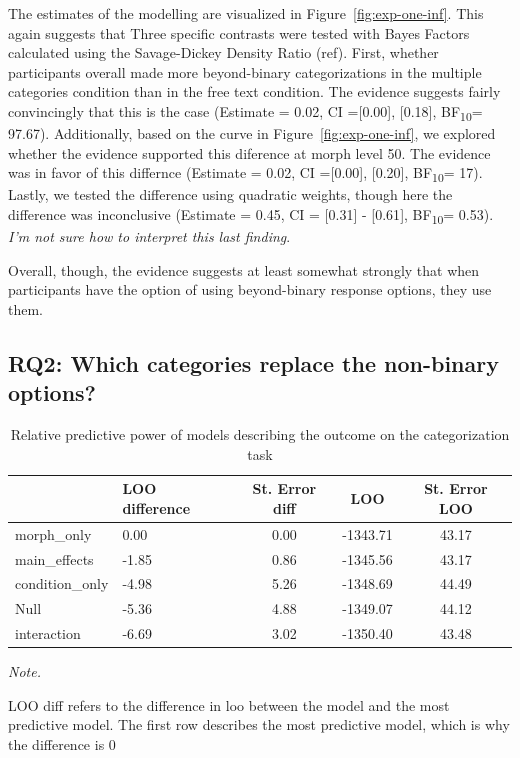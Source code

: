 \documentclass[
  man]{apa7}
\begin{document}
The estimates of the modelling are visualized in Figure~\ref{fig:exp-one-inf}. This again suggests that Three specific contrasts were tested with Bayes Factors calculated using the Savage-Dickey Density Ratio (ref). First, whether participants overall made more beyond-binary categorizations in the multiple categories condition than in the free text condition. The evidence suggests fairly convincingly that this is the case (Estimate = 0.02, CI ={[}0.00{]}, {[}0.18{]}, BF\textsubscript{10}= 97.67). Additionally, based on the curve in Figure~\ref{fig:exp-one-inf}, we explored whether the evidence supported this diference at morph level 50. The evidence was in favor of this differnce (Estimate = 0.02, CI ={[}0.00{]}, {[}0.20{]}, BF\textsubscript{10}= 17). Lastly, we tested the difference using quadratic weights, though here the difference was inconclusive (Estimate = 0.45, CI = {[}0.31{]} - {[}0.61{]}, BF\textsubscript{10}= 0.53). \emph{I'm not sure how to interpret this last finding}.

Overall, though, the evidence suggests at least somewhat strongly that when participants have the option of using beyond-binary response options, they use them.

\hypertarget{rq2-which-categories-replace-the-non-binary-options}{%
\subsection{RQ2: Which categories replace the non-binary options?}\label{rq2-which-categories-replace-the-non-binary-options}}

\begin{table}

\caption{\label{tab:rq2-table}Relative predictive power of models describing the outcome on the categorization task}
\centering
\begin{threeparttable}
\begin{tabular}[t]{llccc}
\toprule
  & LOO difference & St. Error diff & LOO & St. Error LOO\\
\midrule
morph\_only & 0.00 & 0.00 & -1343.71 & 43.17\\
main\_effects & -1.85 & 0.86 & -1345.56 & 43.17\\
condition\_only & -4.98 & 5.26 & -1348.69 & 44.49\\
Null & -5.36 & 4.88 & -1349.07 & 44.12\\
interaction & -6.69 & 3.02 & -1350.40 & 43.48\\
\bottomrule
\end{tabular}
\begin{tablenotes}[para]
\item \textit{Note.} 
\item LOO diff refers to the difference in loo between the model and the most predictive model. The first row describes the most predictive model, which is why the difference is 0
\end{tablenotes}
\end{threeparttable}
\end{table}
\end{document}
